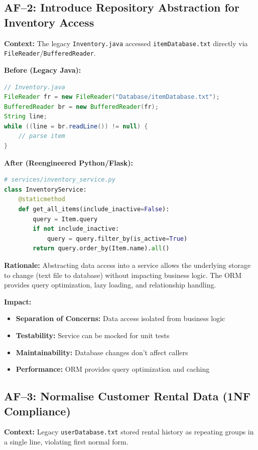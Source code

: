 \subsection{AF--2: Introduce Repository Abstraction for Inventory Access}

\textbf{Context:}
The legacy \texttt{Inventory.java} accessed \texttt{itemDatabase.txt}
directly via \texttt{FileReader}/\texttt{BufferedReader}.

\textbf{Before (Legacy Java):}
\begin{lstlisting}[language=Java]
// Inventory.java
FileReader fr = new FileReader("Database/itemDatabase.txt");
BufferedReader br = new BufferedReader(fr);
String line;
while ((line = br.readLine()) != null) {
    // parse item
}
\end{lstlisting}

\textbf{After (Reengineered Python/Flask):}
\begin{lstlisting}[language=Python]
# services/inventory_service.py
class InventoryService:
    @staticmethod
    def get_all_items(include_inactive=False):
        query = Item.query
        if not include_inactive:
            query = query.filter_by(is_active=True)
        return query.order_by(Item.name).all()
\end{lstlisting}

\textbf{Rationale:}
Abstracting data access into a service allows the underlying storage to
change (text file to database) without impacting business logic. The ORM
provides query optimization, lazy loading, and relationship handling.

\textbf{Impact:}
\begin{itemize}
  \item \textbf{Separation of Concerns:} Data access isolated from business logic
  \item \textbf{Testability:} Service can be mocked for unit tests
  \item \textbf{Maintainability:} Database changes don't affect callers
  \item \textbf{Performance:} ORM provides query optimization and caching
\end{itemize}

\subsection{AF--3: Normalise Customer Rental Data (1NF Compliance)}

\textbf{Context:}
Legacy \texttt{userDatabase.txt} stored rental history as repeating groups
in a single line, violating first normal form.


